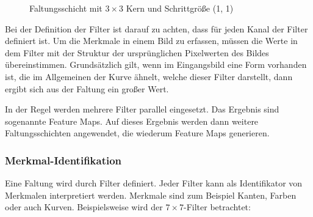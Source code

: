 \begin{figure}[htb]
        \caption{Faltungsschicht mit $3 \times 3$ Kern und Schrittgröße (1, 1)}
        \label{concept:conv2d}
        
    \end{figure}
    
Bei der Definition der Filter ist darauf zu achten, dass für jeden Kanal der Filter definiert ist.
Um die Merkmale in einem Bild zu erfassen, müssen die Werte in dem Filter mit der Struktur der ursprünglichen Pixelwerten des Bildes übereinstimmen. Grundsätzlich gilt, wenn im Eingangsbild eine Form vorhanden ist, die im Allgemeinen der Kurve ähnelt, welche dieser Filter darstellt, dann ergibt sich aus der Faltung ein großer Wert.

In der Regel werden mehrere Filter parallel eingesetzt. Das Ergebnis sind sogenannte Feature Maps. Auf dieses Ergebnis werden dann weitere Faltungsschichten  angewendet, die wiederum Feature Maps generieren. 


\subsubsection{Merkmal-Identifikation}

Eine Faltung wird durch Filter definiert. Jeder Filter kann als Identifikator von Merkmalen interpretiert werden. Merkmale sind zum Beispiel Kanten, Farben oder auch Kurven. Beispielsweise wird der $7\times 7$-Filter betrachtet:

